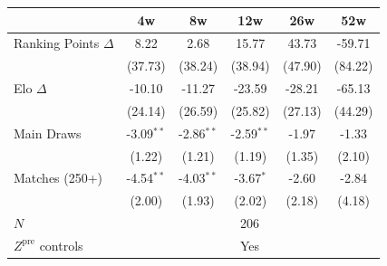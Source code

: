 \begin{tabular}{lccccc}
\toprule
 & 4w & 8w & 12w & 26w & 52w \\
\midrule
Ranking Points $\Delta$ & 8.22 & 2.68 & 15.77 & 43.73 & -59.71 \\
 & (37.73) & (38.24) & (38.94) & (47.90) & (84.22) \\[0.3em]
Elo $\Delta$ & -10.10 & -11.27 & -23.59 & -28.21 & -65.13 \\
 & (24.14) & (26.59) & (25.82) & (27.13) & (44.29) \\[0.3em]
Main Draws & -3.09$^{**}$ & -2.86$^{**}$ & -2.59$^{**}$ & -1.97 & -1.33 \\
 & (1.22) & (1.21) & (1.19) & (1.35) & (2.10) \\[0.3em]
Matches (250+) & -4.54$^{**}$ & -4.03$^{**}$ & -3.67$^{*}$ & -2.60 & -2.84 \\
 & (2.00) & (1.93) & (2.02) & (2.18) & (4.18) \\[0.3em]
\midrule
$N$ & \multicolumn{5}{c}{206} \\
$Z^{\text{pre}}$ controls & \multicolumn{5}{c}{Yes} \\
\bottomrule
\end{tabular}
